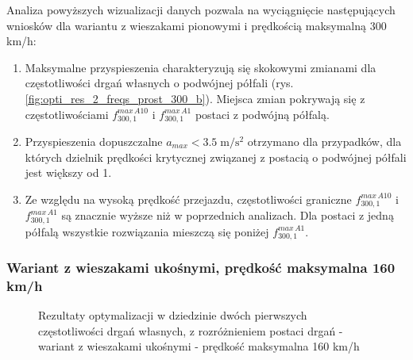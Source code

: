 Analiza powyższych wizualizacji danych pozwala na wyciągnięcie następujących wniosków dla wariantu z wieszakami pionowymi i prędkością maksymalną 300 km/h:
\begin{enumerate}
	\item Maksymalne przyspieszenia charakteryzują się skokowymi zmianami dla częstotliwości drgań własnych o podwójnej półfali (rys. \ref{fig:opti_res_2_freqs_prost_300_b}). Miejsca zmian pokrywają się z częstotliwościami $f_{300,1}^{max\,A10}$ i $f_{300,1}^{max\,A1}$ postaci z podwójną półfalą. 
	
	\item Przyspieszenia dopuszczalne $a_{max}<3.5\;\mathrm{m/s^2}$ otrzymano dla przypadków, dla których dzielnik prędkości krytycznej związanej z postacią o podwójnej półfali jest większy od 1.
	
	\item Ze względu na wysoką prędkość przejazdu, częstotliwości graniczne $f_{300,1}^{max\,A10}$ i $f_{300,1}^{max\,A1}$ są znacznie wyższe niż w poprzednich analizach. Dla postaci z jedną półfalą wszystkie rozwiązania mieszczą się poniżej $f_{300,1}^{max\,A1}$.
\end{enumerate}



\subsubsection{Wariant z wieszakami ukośnymi, prędkość maksymalna 160 km/h}
\begin{figure}[H]
	\centering
\end{figure}


\begin{figure}[H]\ContinuedFloat
\centering
\end{figure}
\begin{figure}[H]\ContinuedFloat
	\centering
		\captionsetup{justification=centering}
	\caption{Rezultaty optymalizacji w dziedzinie dwóch pierwszych częstotliwości drgań własnych, z rozróżnieniem postaci drgań - wariant z wieszakami ukośnymi - prędkość maksymalna 160 km/h}
	\label{fig:opti_res_2_freqs_niels_160}
\end{figure}

